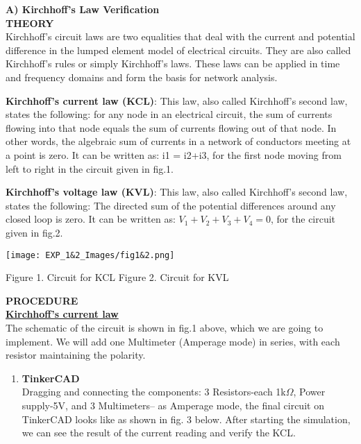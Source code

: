 \documentclass[12pt,a4paper]{article}
\begin{document}
\begin{justify}
\textbf{\large A)	Kirchhoff's Law Verification}\\[6pt]
\textbf{\large THEORY}\\[3pt]
Kirchhoff's circuit laws are two equalities that deal with the current and potential difference in the lumped element model of electrical circuits. They are also called Kirchhoff's rules or simply Kirchhoff's laws. These laws can be applied in time and frequency domains and form the basis for network analysis.

\noindent \textbf{Kirchhoff's current law (KCL)}: This law, also called Kirchhoff's second law, states the following: for any node in an electrical circuit, the sum of currents flowing into that node equals the sum of currents flowing out of that node. In other words, the algebraic sum of currents in a network of conductors meeting at a point is zero. It can be written as:  i1 = i2+i3, for the first node moving from left to right in the circuit given in fig.1.

\noindent \textbf{Kirchhoff's voltage law (KVL)}: This law, also called Kirchhoff's second law, states the following: The directed sum of the potential differences around any closed loop is zero. It can be written as: $V_1 + V_2 + V_3 +V_4 = 0$, for the circuit given in fig.2.



\begin{center} 
\texttt{[image: EXP\_1\&2\_Images/fig1\&2.png]}
\end{center}
\vspace{-10mm}
\begin{center} {Figure 1. Circuit for KCL \hspace{5cm} Figure 2. Circuit for KVL}\end{center}

\noindent \textbf{\large PROCEDURE}\\[6pt]
\underline{\textbf{Kirchhoff's current law}}\\
The schematic of the circuit is shown in fig.1 above, which we are going to implement. We will add one Multimeter (Amperage mode) in series, with each resistor maintaining the polarity.


\begin{enumerate}
\setlength\itemsep{-0.3em}
\item{\textbf{TinkerCAD}}\\
Dragging and connecting the components: 3 Resistors-each 1k$\Omega$, Power supply-5V, and 3 Multimeters-- as Amperage mode, the final circuit on TinkerCAD looks like as shown in fig. 3 below. After starting the simulation, we can see the result of the current reading and verify the KCL.


\end{enumerate}
\end{justify}
\end{document}
